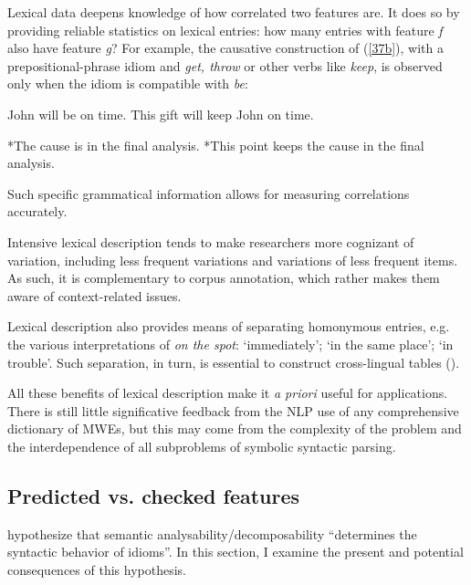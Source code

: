 \documentclass[output=paper]{langsci/langscibook}
\begin{document}
Lexical data deepens knowledge of how correlated two features are. It does so by providing reliable statistics on lexical entries: how many entries with feature \textit{f} also have feature \textit{g}? For example, the causative construction of (\ref{37b}), with a prepositional-phrase idiom and \textit{get, throw} or other verbs like \textit{keep}, is observed only when the idiom is compatible with \textit{be}:

\begin{exe}
\ex \label{56}
 \begin{xlist}
\ex \label{56a}
John will be on time.
\ex \label{56b}
This gift will keep John on time.
\end{xlist}
\end{exe} 

\begin{exe}
\ex \label{57}
 \begin{xlist}
\ex \label{57a}
 *The cause is in the final analysis.
\ex \label{57b}
 *This point keeps the cause in the final analysis.
\end{xlist}
\end{exe}     

\noindent Such specific grammatical information allows for measuring correlations accurately.

Intensive lexical description tends to make researchers more cognizant of variation, including less frequent variations and variations of less frequent items. As such, it is complementary to corpus annotation, which rather makes them aware of context-related issues.

Lexical description also provides means of separating homonymous entries, e.g. the various interpretations of \textit{on the spot}: ‘immediately’; ‘in the same place’; ‘in trouble’. Such separation, in turn, is essential to construct cross-lingual tables (\citealt{Ranchhod}).

All these benefits of lexical description make it \textit{a priori} useful for applications. There is still little significative feedback from the NLP use of any comprehensive dictionary of MWEs, but this may come from the complexity of the problem and the interdependence of all subproblems of symbolic syntactic parsing. 

\subsection{Predicted vs. checked features} 

\cite[104]{Gibbs1989} hypothesize that semantic analysability\slash decomposabil\-ity “determines the syntactic behavior of idioms”. In this section, I examine the present and potential consequences of this hypothesis.
\end{document}
